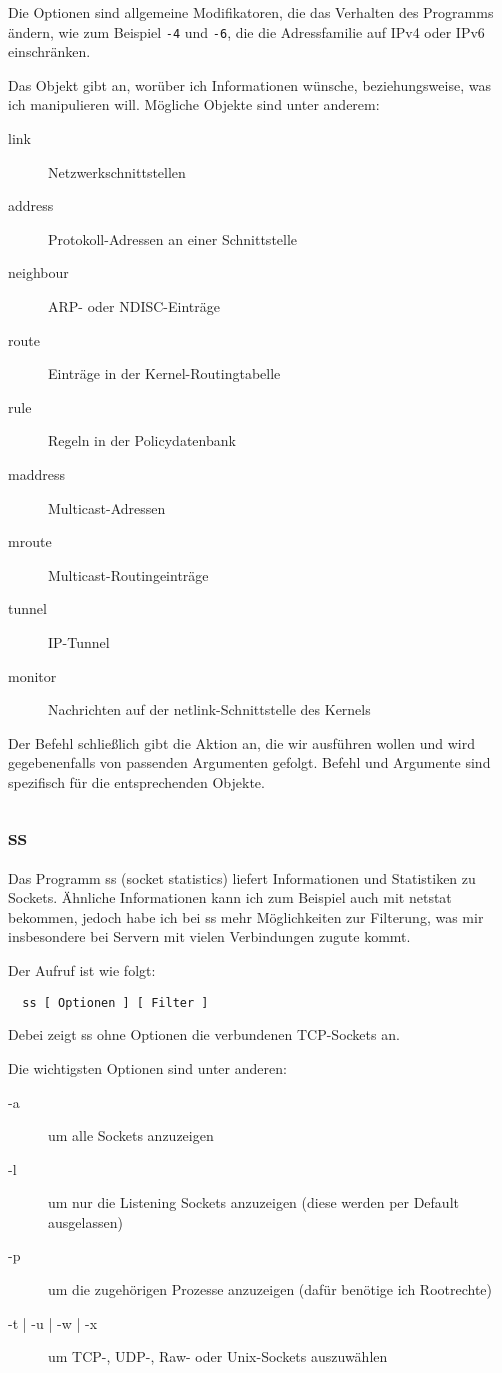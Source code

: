 \begin{normaltext}
  Die Optionen sind allgemeine Modifikatoren, die das Verhalten des Programms
  ändern, wie zum Beispiel \verb?-4? und \verb?-6?, die die Adressfamilie auf
  IPv4 oder IPv6 einschränken.

  Das Objekt gibt an, worüber ich Informationen wünsche, beziehungsweise, was
  ich manipulieren will. Mögliche Objekte sind unter anderem:
  \begin{description}
    \item[link] Netzwerkschnittstellen
    \item[address] Protokoll-Adressen an einer Schnittstelle
    \item[neighbour] ARP- oder NDISC-Einträge
    \item[route] Einträge in der Kernel-Routingtabelle
    \item[rule] Regeln in der Policydatenbank
    \item[maddress] Multicast-Adressen
    \item[mroute] Multicast-Routingeinträge
    \item[tunnel] IP-Tunnel
    \item[monitor] Nachrichten auf der netlink-Schnittstelle des Kernels
  \end{description}

  Der Befehl schließlich gibt die Aktion an, die wir ausführen wollen und wird
  gegebenenfalls von passenden Argumenten gefolgt. Befehl und Argumente sind
  spezifisch für die entsprechenden Objekte.
\end{normaltext}

  \subsection*{ss}

  Das Programm ss (socket statistics) liefert Informationen und Statistiken zu
  Sockets. Ähnliche Informationen kann ich zum Beispiel auch mit netstat
  bekommen, jedoch habe ich bei ss mehr Möglichkeiten zur Filterung, was mir
  insbesondere bei Servern mit vielen Verbindungen zugute kommt.

  Der Aufruf ist wie folgt:
  \begin{verbatim}
  ss [ Optionen ] [ Filter ]
  \end{verbatim}

  Debei zeigt ss ohne Optionen die verbundenen TCP-Sockets an.

  Die wichtigsten Optionen sind unter anderen:
  \begin{description}
    \item[-a] um alle Sockets anzuzeigen
    \item[-l] um nur die Listening Sockets anzuzeigen (diese werden per
      Default ausgelassen)
    \item[-p] um die zugehörigen Prozesse anzuzeigen (dafür benötige ich
      Rootrechte)
    \item[-t | -u | -w | -x] um TCP-, UDP-, Raw- oder Unix-Sockets auszuwählen
  \end{description}

